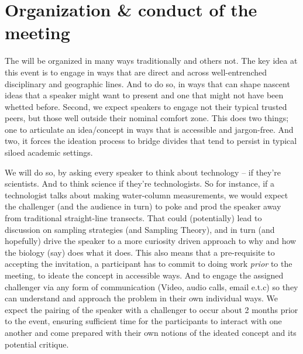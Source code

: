 \section{Organization \& conduct of the meeting}

The \symp will be organized in many ways traditionally and others
not. The key idea at this event is to engage in ways that are direct and
across well-entrenched disciplinary and geographic lines. And to do so,
in ways that can shape nascent ideas that a speaker might want to
present and one that might not have been whetted before. Second, we
expect speakers to engage not their typical trusted peers, but those
well outside their nominal comfort zone. This does two things; one to
articulate an idea/concept in ways that is accessible and
jargon-free. And two, it forces the ideation process to bridge divides
that tend to persist in typical siloed academic settings.

We will do so, by asking every speaker to think about technology -- if
they're scientists. And to think science if they're technologists. So
for instance, if a technologist talks about making water-column
measurements, we would expect the challenger (and the audience in turn)
to poke and prod the speaker away from traditional straight-line
transects. That could (potentially) lead to discussion on sampling
strategies (and Sampling Theory), and in turn (and hopefully) drive the
speaker to a more curiosity driven approach to why and how the biology
(say) does what it does. This also means that a pre-requisite to
accepting the invitation, a participant has to commit to doing work
\emph{prior} to the meeting, to ideate the concept in accessible
ways. And to engage the assigned challenger via any form of
communication (Video, audio calls, email e.t.c) so they can understand
and approach the problem in their own individual ways. We expect the
pairing of the speaker with a challenger to occur about 2 months prior
to the event, ensuring sufficient time for the participants to interact
with one another and come prepared with their own notions of the ideated
concept and its potential critique. 


